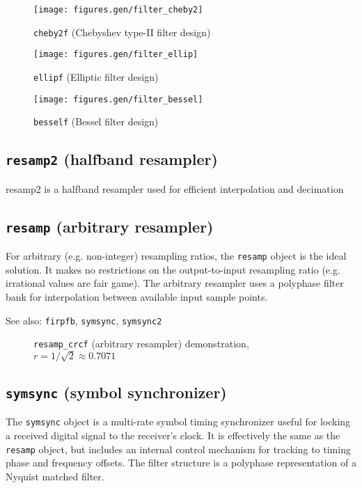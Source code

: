 \begin{figure}
\centering
\texttt{[image: figures.gen/filter\_cheby2]}
\caption{{\tt cheby2f} (Chebyshev type-II filter design)}
\label{fig:module:filter:cheby2}
\end{figure}

\begin{figure}
\centering
\texttt{[image: figures.gen/filter\_ellip]}
\caption{{\tt ellipf} (Elliptic filter design)}
\label{fig:module:filter:ellip}
\end{figure}

\begin{figure}
\centering
\texttt{[image: figures.gen/filter\_bessel]}
\caption{{\tt besself} (Bessel filter design)}
\label{fig:module:filter:bessel}
\end{figure}


\subsection{{\tt resamp2} (halfband resampler)}
resamp2 is a halfband resampler used for efficient interpolation and
decimation

\subsection{{\tt resamp} (arbitrary resampler)}
For arbitrary (e.g. non-integer) resampling ratios, the {\tt resamp} object is
the ideal solution.
It makes no restrictions on the output-to-input resampling ratio (e.g.
irrational values are fair game).
The arbitrary resampler uses a polyphase filter bank for interpolation between
available input sample points.

See also: {\tt firpfb}, {\tt symsync}, {\tt symsync2}

\begin{figure}
\centering
{}
\caption{{\tt resamp\_crcf} (arbitrary resampler) demonstration,
$r=1/\sqrt{2}\approx0.7071$}
\label{fig:module:filter:resamp_crcf}
\end{figure}

\subsection{{\tt symsync} (symbol synchronizer)}
The {\tt symsync} object is a multi-rate symbol timing synchronizer useful for
locking a received digital signal to the receiver's clock.
It is effectively the same as the {\tt resamp} object, but includes an
internal control mechanism for tracking to timing phase and frequency offsets.
The filter structure is a polyphase representation of a Nyquist matched
filter.

